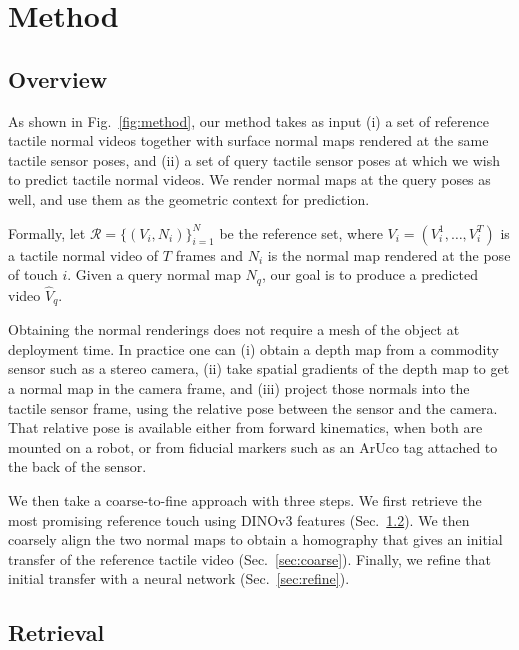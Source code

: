 \section{Method}
\label{sec:method}



\subsection{Overview}

As shown in Fig.~\ref{fig:method}, our method takes as input (i) a set of reference tactile normal
videos together with surface normal maps rendered at the same tactile sensor poses, and (ii) a set
of query tactile sensor poses at which we wish to predict tactile normal videos. We render normal
maps at the query poses as well, and use them as the geometric context for prediction.

Formally, let $\mathcal{R} = \{ (V_i, N_i) \}_{i=1}^{N}$ be the reference set, where
$V_i = (V_i^1, \dots, V_i^T)$ is a tactile normal video of $T$ frames and $N_i$ is the normal
map rendered at the pose of touch $i$. Given a query normal map $N_q$, our goal is to produce a
predicted video $\hat{V}_q$.

Obtaining the normal renderings does not require a mesh of the object at deployment time. In
practice one can (i) obtain a depth map from a commodity sensor such as a stereo camera,
(ii) take spatial gradients of the depth map to get a normal map in the camera frame, and
(iii) project those normals into the tactile sensor frame, using the relative pose between the
sensor and the camera. That relative pose is available either from forward kinematics, when both
are mounted on a robot, or from fiducial markers such as an ArUco tag attached to the back of the
sensor.

We then take a coarse-to-fine approach with three steps. We first retrieve the most promising
reference touch using DINOv3 features (Sec.~\ref{sec:retrieval}). We then coarsely align the two
normal maps to obtain a homography that gives an initial transfer of the reference tactile video
(Sec.~\ref{sec:coarse}). Finally, we refine that initial transfer with a neural network
(Sec.~\ref{sec:refine}).

\subsection{Retrieval}
\label{sec:retrieval}

